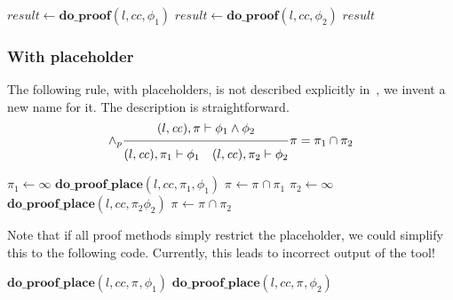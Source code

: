 \documentclass{article}
\newcommand{\proofrule}[3][]{#1 \frac{\raisebox{.7ex}{\normalsize{$#2$}}}
  {\raisebox{-1.0ex}{\normalsize{$#3$}}}}
\newcommand{\placeholder}[1][]{\pi_{#1}}
\newcommand{\loc}{l}
\newcommand{\region}{\mathit{cc}}
\newcommand{\var}[1]{\ensuremath{\mathit{#1}}}
\newcommand{\method}[1]{\ensuremath{\mathbf{#1}}}
\begin{document}
\begin{algorithm}[H]
\caption{$\method{do\_proof\_and}(\loc, \region, \phi_1 \land \phi_2)$}
\begin{algorithmic}
\STATE $\var{result} \gets \method{do\_proof}(\loc, \region, \phi_1)$
\IF{\var{result}}
  \STATE $\var{result} \gets \method{do\_proof}(\loc, \region, \phi_2)$
\ENDIF
\RETURN \var{result}
\end{algorithmic}
\end{algorithm}

\subsubsection{With placeholder}
The following rule, with placeholders, is not described explicitly in~\cite{FC:14,FC:14report}, we invent a new name for it. The description is straightforward.
\[
\proofrule[\land_p]
{(\loc, \region), \placeholder \vdash \phi_1 \land \phi_2}
{(\loc, \region), \placeholder[1] \vdash \phi_1
\quad (\loc, \region), \placeholder[2] \vdash \phi_2}
\placeholder = \placeholder[1] \cap \placeholder[2]
\]

\begin{algorithm}[H]
\caption{$\method{do\_proof\_place\_and}(\loc, \region, \placeholder, \phi_1 \land \phi_2)$}
\begin{algorithmic}
\STATE $\placeholder[1] \gets \infty$
\STATE $\method{do\_proof\_place}(\loc, \region, \placeholder[1], \phi_1)$
\STATE $\placeholder \gets \placeholder \cap \placeholder[1]$
\IF{$\placeholder = \emptyset$}
  \STATE $\placeholder[2] \gets \infty$
  \STATE $\method{do\_proof\_place}(\loc, \region, \placeholder[2] \phi_2)$
  \STATE $\placeholder \gets \placeholder \cap \placeholder[2]$
\ENDIF
\end{algorithmic}
\end{algorithm}
Note that if all proof methods simply restrict the placeholder, we could simplify this to the following code.
Currently, this leads to incorrect output of the tool!
\begin{algorithm}[H]
\caption{$\method{do\_proof\_place\_and}(\loc, \region, \placeholder, \phi_1 \land \phi_2)$}
\begin{algorithmic}
\STATE $\method{do\_proof\_place}(\loc, \region, \placeholder, \phi_1)$
\IF{$\placeholder = \emptyset$}
  \STATE $\method{do\_proof\_place}(\loc, \region, \placeholder, \phi_2)$
\ENDIF
\end{algorithmic}
\end{algorithm}
\end{document}

